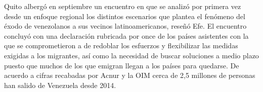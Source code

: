 \documentclass{article}%
\begin{document}
\newline%
%
Quito albergó en septiembre un encuentro en que se analizó por primera vez desde un enfoque regional los distintos escenarios que plantea el fenómeno del éxodo de venezolanos a sus vecinos latinoamericanos, reseñó Efe.%
\newline%
%
El encuentro concluyó con una declaración rubricada por once de los países asistentes con la que se comprometieron a de redoblar los esfuerzos y flexibilizar las medidas exigidas a los migrantes, así como la necesidad de buscar soluciones a medio plazo puesto que muchos de los que emigran llegan a los países para quedarse.%
\newline%
%
De acuerdo a cifras recabadas por Acnur y la OIM cerca de 2,5 millones de personas han salido de Venezuela desde 2014.%
\newline%
%
\end{document}
